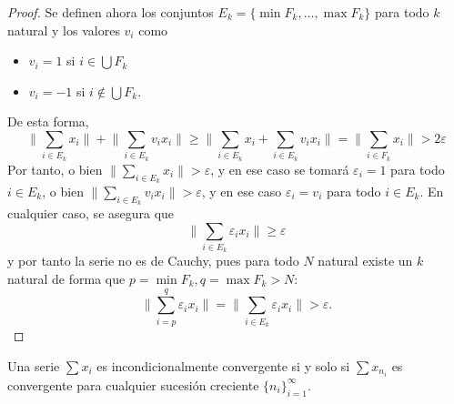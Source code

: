 \begin{proof}
			Se definen ahora los conjuntos $E_{k} = \{ \min F_{k}, \dots, \max F_{k} \}$ para todo $k$ natural y los valores $v_i$ como
			\begin{itemize}
				\item[$\circ$] $v_{i} = 1$ si $i \in \bigcup F_{k}$
				\item[$\circ$] $v_{i}= -1$ si $i \not\in \bigcup F_{k}$.
			\end{itemize}
			De esta forma,
			\[\big\|  \sum_{i \in E_{k}}{x_{i}}  \big\| + \big\|  \sum_{i \in E_{k}}{v_{i}x_{i}}  \big\| \geq \big\|  \sum_{i \in E_{k}}{x_{i}} + \sum_{i \in E_{k}}{v_{i}x_{i}}  \big\| = \big\|  \sum_{i \in F_{k}}{x_{i}}  \big\| > 2 \varepsilon\]
			Por tanto, o bien $\big\| \displaystyle \sum_{i \in E_{k}}{x_{i}}  \big\| > \varepsilon$, y en ese caso se tomará $\varepsilon_{i}=1$ para todo $i \in E_{k}$, o bien $\big\| \displaystyle \sum_{i \in E_{k}}{v_{i}x_{i}}  \big\| > \varepsilon$, y en ese caso $\varepsilon_{i} = v_{i}$ para todo $i \in E_{k}$. En cualquier caso, se asegura que 
			\[\big\|  \sum_{i \in E_{k}}{\varepsilon_{i}x_{i}}  \big\| \geq \varepsilon\]
			y por tanto la serie no es de Cauchy, pues para todo $N$ natural existe un $k$ natural de forma que $p = \min F_{k}, q = \max F_{k} > N$:
			\[\big\|  \sum_{i=p}^{q}{\varepsilon_{i}x_{i}}  \big\| = \big\|  \sum_{i \in E_{k}}{\varepsilon_{i}x_{i}}  \big\| > \varepsilon.\]
			
		\end{proof}
	
	\begin{lemma}\label{lm:inc-conv-conv-subset}
		Una serie $\sum{x_{i}}$ es incondicionalmente convergente si y solo si $\sum{x_{n_{i}}}$ es convergente para cualquier sucesión creciente $\{ n_{i} \}_{i=1}^{\infty}$.
		
	\end{lemma}
	
